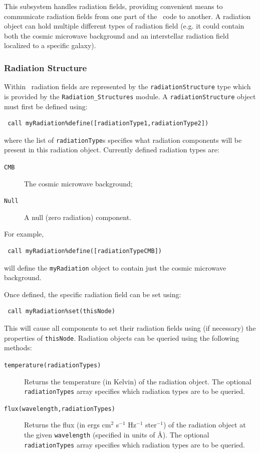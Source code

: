 This subsystem handles radiation fields, providing convenient means to communicate radiation fields from one part of the \glc\ code to another. A radiation object can hold multiple different types of radiation field (e.g. it could contain both the cosmic microwave background and an interstellar radiation field localized to a specific galaxy).

\subsubsection{Radiation Structure}

Within \glc\ radiation fields are represented by the {\tt radiationStructure} type which is provided by the {\tt Radiation\_Structures} module. A {\tt radiationStructure} object must first be defined using:
\begin{verbatim}
 call myRadiation%define([radiationType1,radiationType2])
\end{verbatim}
where the list of {\tt radiationType}s specifies what radiation components will be present in this radiation object. Currently defined radiation types are:
\begin{description}
 \item[{\tt CMB}] The cosmic microwave background;
 \item[{\tt Null}] A null (zero radiation) component.
\end{description}
For example,
\begin{verbatim}
 call myRadiation%define([radiationTypeCMB])
\end{verbatim}
will define the {\tt myRadiation} object to contain just the cosmic microwave background.

Once defined, the specific radiation field can be set using:
\begin{verbatim}
 call myRadiation%set(thisNode)
\end{verbatim}
This will cause all components to set their radiation fields using (if necessary) the properties of {\tt thisNode}. Radiation objects can be queried using the following methods:
\begin{description}
 \item[{\tt temperature(radiationTypes)}] Returns the temperature (in Kelvin) of the radiation object. The optional {\tt radiationTypes} array specifies which radiation types are to be queried.
 \item[{\tt flux(wavelength,radiationTypes)}] Returns the flux (in ergs cm$^2$ s$^{-1}$ Hz$^{-1}$ ster$^{-1}$) of the radiation object at the given {\tt wavelength} (specified in units of \AA). The optional {\tt radiationTypes} array specifies which radiation types are to be queried.
\end{description}

